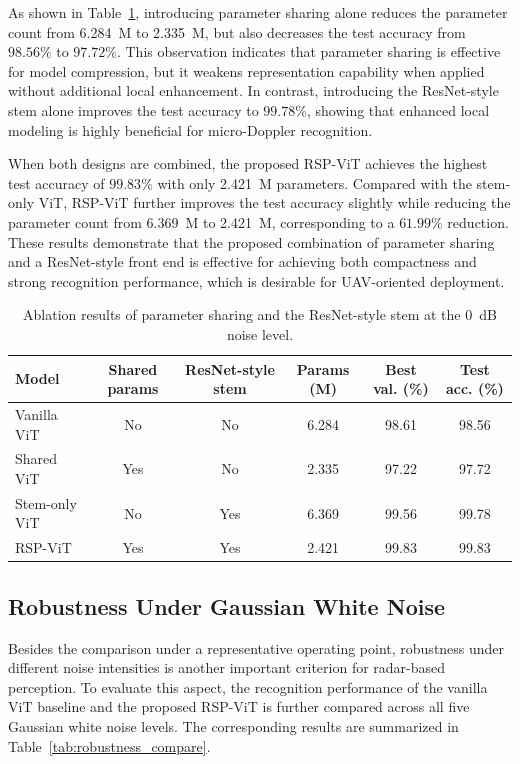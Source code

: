 \documentclass{svproc}
\begin{document}
As shown in Table~\ref{tab:ablation_compare}, introducing parameter sharing alone reduces the parameter count from 6.284~M to 2.335~M, but also decreases the test accuracy from $98.56\%$ to $97.72\%$. This observation indicates that parameter sharing is effective for model compression, but it weakens representation capability when applied without additional local enhancement. In contrast, introducing the ResNet-style stem alone improves the test accuracy to $99.78\%$, showing that enhanced local modeling is highly beneficial for micro-Doppler recognition.

When both designs are combined, the proposed RSP-ViT achieves the highest test accuracy of $99.83\%$ with only 2.421~M parameters. Compared with the stem-only ViT, RSP-ViT further improves the test accuracy slightly while reducing the parameter count from 6.369~M to 2.421~M, corresponding to a $61.99\%$ reduction. These results demonstrate that the proposed combination of parameter sharing and a ResNet-style front end is effective for achieving both compactness and strong recognition performance, which is desirable for UAV-oriented deployment.

\begin{table}[t]
\caption{Ablation results of parameter sharing and the ResNet-style stem at the $0$~dB noise level.}
\label{tab:ablation_compare}
\centering
\small
\begin{tabular}{lccccc}
\hline
Model & Shared params & ResNet-style stem & Params (M) & Best val. (\%) & Test acc. (\%) \\
\hline
Vanilla ViT & No  & No  & 6.284 & 98.61 & 98.56 \\
Shared ViT  & Yes & No  & 2.335 & 97.22 & 97.72 \\
Stem-only ViT & No & Yes & 6.369 & 99.56 & 99.78 \\
RSP-ViT & Yes & Yes & 2.421 & 99.83 & 99.83 \\
\hline
\end{tabular}
\end{table}


\subsection{Robustness Under Gaussian White Noise}

Besides the comparison under a representative operating point, robustness under different noise intensities is another important criterion for radar-based perception. To evaluate this aspect, the recognition performance of the vanilla ViT baseline and the proposed RSP-ViT is further compared across all five Gaussian white noise levels. The corresponding results are summarized in Table~\ref{tab:robustness_compare}.
\end{document}
